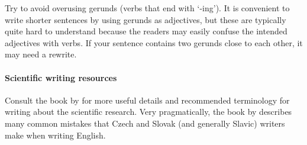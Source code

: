 Try to avoid overusing gerunds (verbs that end with `-ing'). It is convenient to write shorter sentences by using gerunds as adjectives, but these are typically quite hard to understand because the readers may easily confuse the intended adjectives with verbs. If your sentence contains two gerunds close to each other, it may need a rewrite.

\paragraph{Scientific writing resources}
Consult the book by \citet{glasman2010science} for more useful details and recommended terminology for writing about the scientific research. Very pragmatically, the book by \citet{sparling1989english} describes many common mistakes that Czech and Slovak (and generally Slavic) writers make when writing English.
\fi

